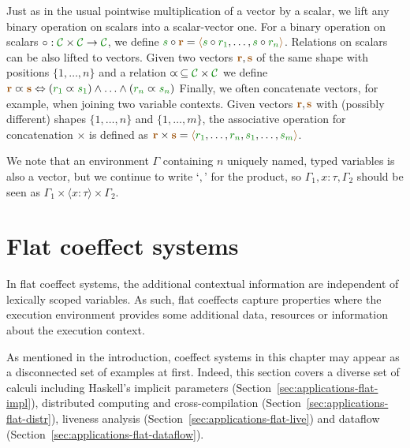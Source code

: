 Just as in the usual pointwise multiplication of a vector by a scalar, we lift any binary operation on scalars into a
scalar-vector one. For a binary operation on scalars $\circ : \C \times \C \rightarrow \C$, we define
 $\cclrd{s} \circ \aclrd{\textbf{r}} = \alift{ \cclrd{s}\circ\cclrd{r_1}, \ldots, \cclrd{s}\circ\cclrd{r_n}}$.
Relations on scalars can be also lifted to vectors. Given two vectors $\aclrd{\textbf{r}}, \aclrd{\textbf{s}}$ of the
same shape with positions $\{ 1, \ldots, n \}$ and a relation $\varpropto\, \subseteq \C \times \C$ we define
$\aclrd{\textbf{r}} \varpropto \aclrd{\textbf{s}} \Leftrightarrow (\cclrd{r_1} \varpropto \cclrd{s_1}) \wedge \ldots \wedge (\cclrd{r_n} \varpropto \cclrd{s_n}) $
Finally, we often concatenate vectors, for example, when joining two variable contexts.
Given vectors $\aclrd{\textbf{r}}, \aclrd{\textbf{s}}$ with (possibly different) shapes $\{ 1, \ldots, n \}$ and
$\{ 1, \ldots, m \}$, the associative operation for concatenation $\times$ is defined as
$\aclrd{\textbf{r}}\times\aclrd{\textbf{s}} = \alift{\cclrd{r_1},\ldots,\cclrd{r_n},\cclrd{s_1},\ldots,\cclrd{s_m}}$.

We note that an environment $\Gamma$ containing $n$ uniquely named, typed variables is also a vector,
but we continue to write `$,$' for the product, so $\Gamma_1, x\!:\!\tau, \Gamma_2$ should
be seen as $\Gamma_1 \times \langle x\!:\!\tau\rangle \times \Gamma_2$.




%
%

\section{Flat coeffect systems}
\label{sec:applications-flat}

In flat coeffect systems, the additional contextual information are independent of lexically scoped
variables. As such, flat coeffects capture properties where the execution environment provides some
additional data, resources or information about the execution context.

As mentioned in the introduction, coeffect systems in this chapter may appear as a disconnected
set of examples at first. Indeed, this section covers a diverse set of calculi including
Haskell's implicit parameters (Section~\ref{sec:applications-flat-impl}), distributed computing and
cross-compilation (Section~\ref{sec:applications-flat-distr}), liveness analysis
(Section~\ref{sec:applications-flat-live}) and dataflow (Section~\ref{sec:applications-flat-dataflow}).

